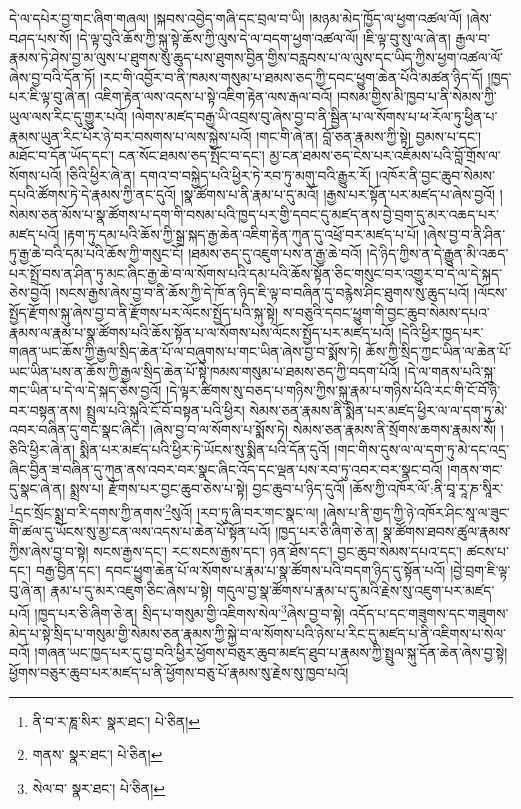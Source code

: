 དེ་ལ་དཔེར་བྱ་གང་ཞིག་གཞལ། །སྐབས་འབྱེད་གཞི་དང་བྲལ་བ་ཡི། །མཉམ་མེད་ཁྱོད་ལ་ཕྱག་འཚལ་ལོ། །ཞེས་བཤད་པས་སོ། །དེ་ལྟ་བུའི་ཆོས་ཀྱི་སྐུ་སྟེ་ཆོས་ཀྱི་ལུས་དེ་ལ་བདག་ཕྱག་འཚལ་ལོ། །ཇི་ལྟ་བུ་སུ་ལ་ཞེ་ན། རྒྱལ་བ་རྣམས་ཏེ་ཤེས་བྱ་མ་ལུས་པ་ཐུགས་སུ་ཆུད་པས་ཐུགས་བྱིན་གྱིས་བརླབས་པ་ལ་ལུས་དང་ཡིད་ཀྱིས་ཕྱག་འཚལ་ལོ་ཞེས་བྱ་བའི་དོན་ཏོ། །རང་གི་འབྱོར་བ་ནི་ཁམས་གསུམ་པ་ཐམས་ཅད་ཀྱི་དབང་ཕྱུག་ཆེན་པོའི་མཚན་ཉིད་དོ། །ཁྱད་པར་ཇི་ལྟ་བུ་ཞེ་ན། འཇིག་རྟེན་ལས་འདས་པ་སྟེ་འཇིག་རྟེན་ལས་རྒལ་བའོ། །བསམ་གྱིས་མི་ཁྱབ་པ་ནི་སེམས་ཀྱི་ཡུལ་ལས་རིང་དུ་གྱུར་པའོ། །ལེགས་མཛད་བརྒྱ་ཡི་འབྲས་བུ་ཞེས་བྱ་བ་ནི་སྦྱིན་པ་ལ་སོགས་པ་ཕ་རོལ་ཏུ་ཕྱིན་པ་རྣམས་ཡུན་རིང་པོར་ཉེ་བར་བསགས་པ་ལས་སྐྱེས་པའོ། །གང་གི་ཞེ་ན། བློ་ཅན་རྣམས་ཀྱི་སྟེ། བྱམས་པ་དང་། མཐོང་བ་དོན་ཡོད་དང་། ངན་སོང་ཐམས་ཅད་སྤོང་བ་དང་། མྱ་ངན་ཐམས་ཅད་ངེས་པར་འཇོམས་པའི་བློ་གྲོས་ལ་སོགས་པའོ། །ཅིའི་ཕྱིར་ཞེ་ན། དགའ་བ་བསྐྱེད་པའི་ཕྱིར་ཏེ་རབ་ཏུ་མགུ་བའི་རྒྱུར་རོ། །འཁོར་ནི་བྱང་ཆུབ་སེམས་དཔའི་ཚོགས་ཏེ་དེ་རྣམས་ཀྱི་ནང་དུའོ། །སྣ་ཚོགས་པ་ནི་རྣམ་པ་དུ་མའོ། །རྒྱས་པར་སྟོན་པར་མཛད་པ་ཞེས་བྱའོ། །སེམས་ཅན་མོས་པ་སྣ་ཚོགས་པ་དག་གི་བསམ་པའི་ཁྱད་པར་གྱི་དབང་དུ་མཛད་ནས་བྱེ་བྲག་དུ་མར་འཆད་པར་མཛད་པའོ། །རྟག་ཏུ་དམ་པའི་ཆོས་ཀྱི་སྒྲ་སྐད་རྒྱ་ཆེན་འཇིག་རྟེན་ཀུན་དུ་འཕྲོ་བར་མཛད་པ་པོ། །ཞེས་བྱ་བ་ནི་ཤིན་ཏུ་རྒྱ་ཆེ་བའི་དམ་པའི་ཆོས་ཀྱི་གསུང་ངོ། །ཐམས་ཅད་དུ་འཇུག་པས་ན་རྒྱ་ཆེ་བའོ། །དེ་ཉིད་ཀྱིས་ན་དེ་རྒྱུན་མི་འཆད་པར་སྤྲོ་བས་ན་ཤིན་ཏུ་མང་ཞིང་རྒྱ་ཆེ་བ་ལ་སོགས་པའི་དམ་པའི་ཆོས་སྟོན་ཅིང་གསུང་བར་འགྱུར་བ་དེ་ལ་དེ་སྐད་ཅེས་བྱའོ། །སངས་རྒྱས་ཞེས་བྱ་བ་ནི་ཆོས་ཀྱི་དེ་ཁོ་ན་ཉིད་ཇི་ལྟ་བ་བཞིན་དུ་བརྙེས་ཤིང་ཐུགས་སུ་ཆུད་པའོ། །ལོངས་སྤྱོད་རྫོགས་སྐུ་ཞེས་བྱ་བ་ནི་རྫོགས་པར་ལོངས་སྤྱོད་པའི་སྐུ་སྟེ། ས་བཅུའི་དབང་ཕྱུག་གི་བྱང་ཆུབ་སེམས་དཔའ་རྣམས་ལ་རྣམ་པ་སྣ་ཚོགས་པའི་ཆོས་སྟོན་པ་ལ་སོགས་པས་ལོངས་སྤྱོད་པར་མཛད་པའོ། །དེའི་ཕྱིར་ཁྱད་པར་གཞན་ཡང་ཆོས་ཀྱི་རྒྱལ་སྲིད་ཆེན་པོ་ལ་བཞུགས་པ་གང་ཡིན་ཞེས་བྱ་བ་སྨོས་ཏེ། ཆོས་ཀྱི་སྲིད་ཀྱང་ཡིན་ལ་ཆེན་པོ་ཡང་ཡིན་པས་ན་ཆོས་ཀྱི་རྒྱལ་སྲིད་ཆེན་པོ་སྟེ་ཁམས་གསུམ་པ་ཐམས་ཅད་ཀྱི་བདག་པོའོ། །དེ་ལ་གནས་པའི་སྐུ་གང་ཡིན་པ་དེ་ལ་དེ་སྐད་ཅེས་བྱའོ། །དེ་ལྟར་ཚིགས་སུ་བཅད་པ་གཉིས་ཀྱིས་སྐུ་རྣམ་པ་གཉིས་པོའི་རང་གི་ངོ་བོ་ཉེ་བར་བསྟན་ནས། སྤྲུལ་པའི་སྐུའི་ངོ་བོ་བསྟན་པའི་ཕྱིར། སེམས་ཅན་རྣམས་ནི་སྨིན་པར་མཛད་ཕྱིར་ལ་ལ་དག་ཏུ་མེ་འབར་བཞིན་དུ་གང་སྣང་ཞིང་། །ཞེས་བྱ་བ་ལ་སོགས་པ་སྨོས་ཏེ། སེམས་ཅན་རྣམས་ནི་སྲོགས་ཆགས་རྣམས་སོ། །ཅིའི་ཕྱིར་ཞེ་ན། སྨིན་པར་མཛད་པའི་ཕྱིར་ཏེ་ཡོངས་སུ་སྨིན་པའི་དོན་དུའོ། །གང་གིས་དུས་ལ་ལ་དག་ཏུ་མེ་དང་འདྲ་ཞིང་བྱིན་ཟ་བཞིན་དུ་ཀུན་ནས་འབར་བར་སྣང་ཞིང་འོད་དང་ལྡན་པས་རབ་ཏུ་འབར་བར་སྣང་བའོ། །གནས་གང་དུ་སྣང་ཞེ་ན། སྨྲས་པ། རྫོགས་པར་བྱང་ཆུབ་ཅེས་པ་སྟེ། བྱང་ཆུབ་པ་ཉིད་དུའོ། །ཆོས་ཀྱི་འཁོར་ལོ་:ནི་བཱ་རཱ་ཎ་སཱིར་\footnote{ནི་བ་ར་ཎཱ་སིར་  སྣར་ཐང་།  པེ་ཅིན། }དྲང་སྲོང་སྨྲ་བ་རི་དགས་ཀྱི་ནགས་\footnote{གནས་  སྣར་ཐང་།  པེ་ཅིན། }སུའོ། །རབ་ཏུ་ཞི་བར་གང་སྣང་ལ། །ཞེས་པ་ནི་གྱད་ཀྱི་ཉེ་འཁོར་ཤིང་སཱ་ལ་ཟུང་གི་ཚལ་དུ་ཡོངས་སུ་མྱ་ངན་ལས་འདས་པ་ཆེན་པོ་སྟོན་པའོ། །ཁྱད་པར་ཅི་ཞིག་ཅེ་ན། སྣ་ཚོགས་ཐབས་ཚུལ་རྣམས་ཀྱིས་ཞེས་བྱ་བ་སྟེ། སངས་རྒྱས་དང་། རང་སངས་རྒྱས་དང་། ཉན་ཐོས་དང་། བྱང་ཆུབ་སེམས་དཔའ་དང་། ཚངས་པ་དང་། བརྒྱ་བྱིན་དང་། དབང་ཕྱུག་ཆེན་པོ་ལ་སོགས་པ་རྣམ་པ་སྣ་ཚོགས་པའི་བདག་ཉིད་དུ་སྟོན་པའོ། །བྱེ་བྲག་ཇི་ལྟ་བུ་ཞེ་ན། རྣམ་པ་དུ་མར་འཇུག་ཅིང་ཞེས་པ་སྟེ། གདུལ་བྱ་སྣ་ཚོགས་པ་རྣམ་པ་དུ་མའི་རྗེས་སུ་འཇུག་པར་མཛད་པའོ། །ཁྱད་པར་ཅི་ཞིག་ཅེ་ན། སྲིད་པ་གསུམ་གྱི་འཇིགས་སེལ་\footnote{སེལ་བ་  སྣར་ཐང་།  པེ་ཅིན། }ཞེས་བྱ་བ་སྟེ། འདོད་པ་དང་གཟུགས་དང་གཟུགས་མེད་པ་སྟེ་སྲིད་པ་གསུམ་གྱི་སེམས་ཅན་རྣམས་ཀྱི་སྐྱེ་བ་ལ་སོགས་པའི་ཉེས་པ་རིང་དུ་མཛད་པ་ནི་འཇིགས་པ་སེལ་བའོ། །གཞན་ཡང་ཁྱད་པར་དུ་བྱ་བའི་ཕྱིར་ཕྱོགས་བཅུར་ཆུབ་མཛད་ཐུབ་པ་རྣམས་ཀྱི་སྤྲུལ་སྐུ་དོན་ཆེན་ཞེས་བྱ་སྟེ། ཕྱོགས་བཅུར་ཆུབ་པར་མཛད་པ་ནི་ཕྱོགས་བཅུ་པོ་རྣམས་སུ་རྗེས་སུ་ཁྱབ་པའོ། 